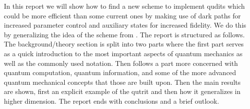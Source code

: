 In this report we will show how to find a new scheme to implement qudits which could be more efficient than some current ones by making use of dark paths for increased parameter control and auxiliary states for increased fidelity. We do this by generalizing the idea of the scheme from \cite{darkpath}. The report is structured as follows. The background/theory section is split into two parts where the first part serves as a quick introduction to the most important aspects of quantum mechanics as well as the commonly used notation. Then follows a part more concerned with quantum computation, quantum information, and some of the more advanced quantum mechanical concepts that those are built upon. Then the main results are shown, first an explicit example of the qutrit and then how it generalizes in higher dimension. The report ends with conclusions and a brief outlook.


